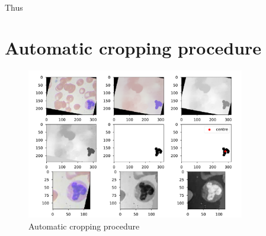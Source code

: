 \documentclass[10pt,a4paper]{article}
\begin{document}



\paragraph{}
Thus 

\printbibliography

\newpage

\appendix

\FloatBarrier
\section{Automatic cropping procedure}

\begin{figure}[!htb]
  \centering
  \includegraphics[width=0.85\textwidth]{Graphs/Find_center.pdf}
  \caption{Automatic cropping procedure}\label{find_centre}
\end{figure}
\end{document}
